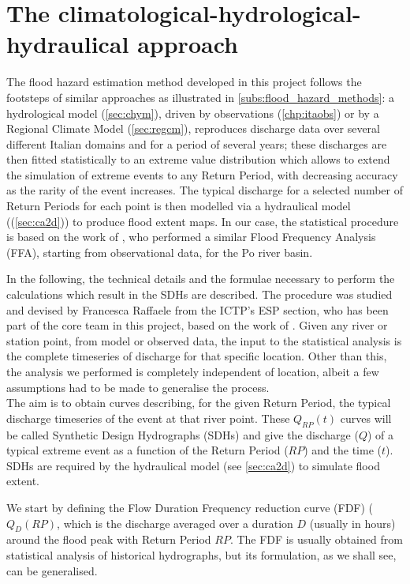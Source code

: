 \section{The climatological-hydrological-hydraulical approach} \label{sec:3_mod_apprach}
The flood hazard estimation method developed in this project follows the footsteps of similar approaches as illustrated in \cref{subs:flood_hazard_methods}: a hydrological model (\cref{sec:chym}), driven by observations (\cref{chp:itaobs}) or by a Regional Climate Model (\cref{sec:regcm}), reproduces discharge data over several different Italian domains and for a period of several years; these discharges are then fitted statistically to an extreme value distribution which allows to extend the simulation of extreme events to any Return Period, with decreasing accuracy as the rarity of the event increases. The typical discharge for a selected number of Return Periods for each point is then modelled via a hydraulical model ((\cref{sec:ca2d})) to produce flood extent maps. In our case, the statistical procedure is based on the work of \citet{Maione2003}, who performed a similar Flood Frequency Analysis (FFA), starting from observational data, for the Po river basin.

In the following, the technical details and the formulae necessary to perform the calculations which result in the SDHs are described.
The procedure was studied and devised by Francesca Raffaele from the ICTP's ESP section, who has been part of the core team in this project, based on the work of \citet{Maione2003}.
Given any river or station point, from model or observed data, the input to the statistical analysis is the complete timeseries of discharge for that specific location. Other than this, the analysis we performed is completely independent of location, albeit a few assumptions had to be made to generalise the process.\\
The aim is to obtain curves describing, for the given Return Period, the typical discharge timeseries of the event at that river point. These $Q_{RP}(t)$ curves will be called Synthetic Design Hydrographs (SDHs) and give the discharge ($Q$) of a typical extreme event as a function of the Return Period ($RP$) and the time ($t$).
SDHs are required by the hydraulical model (see \cref{sec:ca2d}) to simulate flood extent.

We start by defining the Flow Duration Frequency reduction curve (FDF) ($Q_D\left( RP \right)$, which is the discharge averaged over a duration $D$ (usually in hours) around the flood peak with Return Period $RP$.
The FDF is usually obtained from statistical analysis of historical hydrographs, but its formulation, as we shall see, can be generalised.


